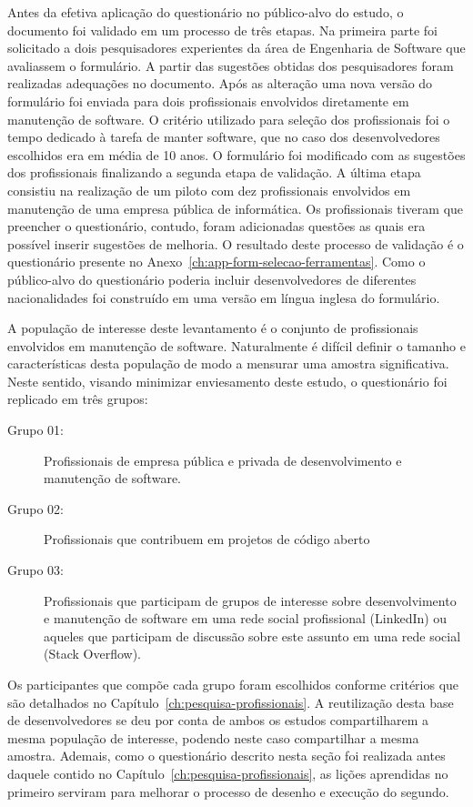 Antes da efetiva aplicação do questionário no público-alvo do estudo, o
documento foi validado em um processo de três etapas. Na primeira parte foi
solicitado a dois pesquisadores experientes da área de Engenharia de Software
que avaliassem o formulário. A partir das sugestões obtidas dos pesquisadores
foram realizadas adequações no documento. Após as alteração uma nova versão do
formulário foi enviada para dois profissionais envolvidos diretamente em
manutenção de software. O critério utilizado para seleção dos profissionais foi
o tempo dedicado à tarefa de manter software, que no caso dos desenvolvedores
escolhidos era em média de 10 anos. O formulário foi modificado com as sugestões
dos profissionais finalizando a segunda etapa de validação. A última etapa
consistiu na realização de um piloto com dez profissionais envolvidos em
manutenção de uma empresa pública de informática. Os profissionais tiveram que
preencher o questionário, contudo, foram adicionadas questões as quais era
possível inserir sugestões de melhoria. O resultado deste processo de validação
é o questionário presente no Anexo~\ref{ch:app-form-selecao-ferramentas}. Como o
público-alvo do questionário poderia incluir desenvolvedores de diferentes
nacionalidades foi construído em uma versão em língua inglesa do formulário.

A população de interesse deste levantamento é o conjunto de profissionais
envolvidos em manutenção de software. Naturalmente é difícil definir o tamanho e
características desta população de modo a mensurar uma amostra significativa.
Neste sentido, visando minimizar enviesamento deste estudo, o questionário
foi replicado em três grupos:

\begin{description}
	\item[Grupo 01:] Profissionais de empresa pública e privada de
			desenvolvimento e manutenção de software.
	\item[Grupo 02:] Profissionais que contribuem em projetos de
		código aberto
	\item[Grupo 03:] Profissionais que participam de grupos de
		interesse sobre desenvolvimento e manutenção de software em uma rede
		social profissional (LinkedIn) ou aqueles que participam de discussão
		sobre este assunto em uma rede social (Stack Overflow).
\end{description}

Os participantes que compõe cada grupo foram escolhidos conforme critérios que
são detalhados no Capítulo~\ref{ch:pesquisa-profissionais}. A reutilização desta
base de desenvolvedores se deu por conta de ambos os estudos compartilharem a
mesma população de interesse, podendo neste caso compartilhar a mesma amostra.
Ademais, como o questionário descrito nesta seção foi realizada antes daquele
contido no Capítulo~\ref{ch:pesquisa-profissionais}, as lições aprendidas no
primeiro serviram para melhorar o processo de desenho e execução do segundo.

